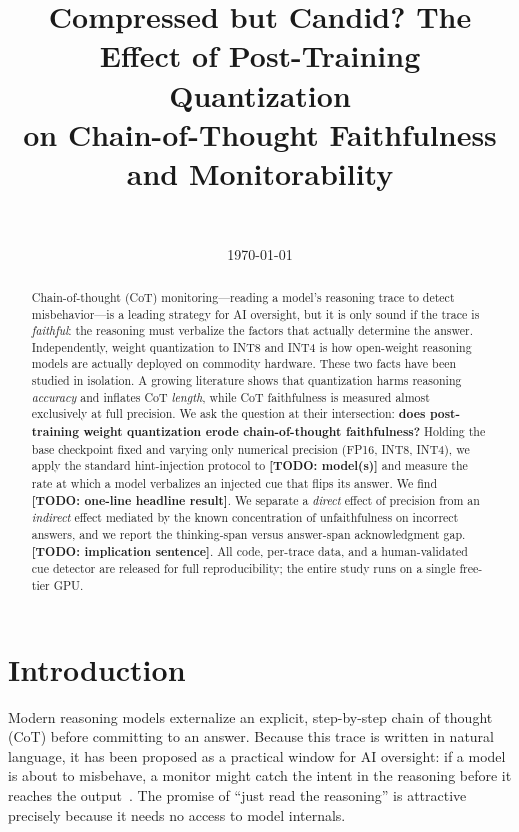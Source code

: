 \documentclass[11pt]{article}
\title{Compressed but Candid? The Effect of Post-Training Quantization\\
       on Chain-of-Thought Faithfulness and Monitorability}
\author{\todo{author name} \\ \todo{affiliation / email}}
\date{\today}
\newcommand{\todo}[1]{{\color{red}\textbf{[TODO: #1]}}}
\begin{document}
\maketitle

\begin{abstract}
Chain-of-thought (CoT) monitoring---reading a model's reasoning trace to detect
misbehavior---is a leading strategy for AI oversight, but it is only sound if the
trace is \emph{faithful}: the reasoning must verbalize the factors that actually
determine the answer. Independently, weight quantization to INT8 and INT4 is how
open-weight reasoning models are actually deployed on commodity hardware. These
two facts have been studied in isolation. A growing literature shows that
quantization harms reasoning \emph{accuracy} and inflates CoT \emph{length},
while CoT faithfulness is measured almost exclusively at full precision. We ask
the question at their intersection: \textbf{does post-training weight
quantization erode chain-of-thought faithfulness?} Holding the base checkpoint
fixed and varying only numerical precision (FP16, INT8, INT4), we apply the
standard hint-injection protocol to \todo{model(s)} and measure the rate at
which a model verbalizes an injected cue that flips its answer. We find
\todo{one-line headline result}. We separate a \emph{direct} effect of precision
from an \emph{indirect} effect mediated by the known concentration of
unfaithfulness on incorrect answers, and we report the thinking-span versus
answer-span acknowledgment gap. \todo{implication sentence}. All code, per-trace
data, and a human-validated cue detector are released for full reproducibility;
the entire study runs on a single free-tier GPU.
\end{abstract}

\section{Introduction}
Modern reasoning models externalize an explicit, step-by-step chain of thought
(CoT) before committing to an answer. Because this trace is written in natural
language, it has been proposed as a practical window for AI oversight: if a model
is about to misbehave, a monitor might catch the intent in the reasoning before
it reaches the output~\cite{cotmonitorability2025,baker2025}. The promise of
``just read the reasoning'' is attractive precisely because it needs no access to
model internals.
\end{document}
